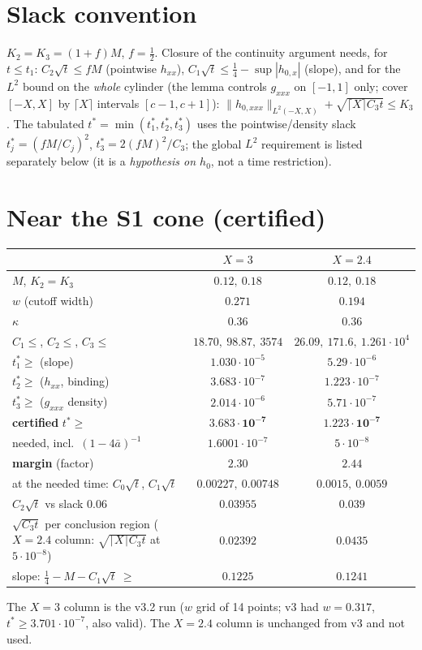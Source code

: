 \documentclass[11pt]{article}
\begin{document}
\section{Slack convention}
$K_2=K_3=(1+f)M$, $f=\frac12$. Closure of the continuity argument needs, for $t\le t_1$: $C_2\sqrt t\le fM$ (pointwise $h_{xx}$), $C_1\sqrt t\le \frac14-\sup|h_{0,x}|$ (slope), and for the $L^2$ bound on the \emph{whole} cylinder (the lemma controls $g_{xxx}$ on $[-1,1]$ only; cover $[-X,X]$ by $\lceil X\rceil$ intervals $[c-1,c+1]$): $\|h_{0,xxx}\|_{L^2(-X,X)}+\sqrt{\lceil X\rceil C_3t}\le K_3$. The tabulated $t^*=\min(t_1^*,t_2^*,t_3^*)$ uses the pointwise/density slack $t_j^*=(fM/C_j)^2$, $t_3^*=2(fM)^2/C_3$; the global $L^2$ requirement is listed separately below (it is a \emph{hypothesis on $h_0$}, not a time restriction).

\section{Near the S1 cone (certified)}
\begin{center}\small\begin{tabular}{lcc}\toprule
 & $X=3$ & $X=2.4$\\\midrule
$M$, $K_2=K_3$ & $0.12,\ 0.18$ & $0.12,\ 0.18$\\
$w$ (cutoff width) & $0.271$ & $0.194$\\
$\kappa$ & $0.36$ & $0.36$\\
$C_1\le$, $C_2\le$, $C_3\le$ & $18.70,\ 98.87,\ 3574$ & $26.09,\ 171.6,\ 1.261\cdot10^4$\\
$t_1^*\ge$ (slope) & $1.030\cdot10^{-5}$ & $5.29\cdot10^{-6}$\\
$t_2^*\ge$ ($h_{xx}$, binding) & $3.683\cdot10^{-7}$ & $1.223\cdot10^{-7}$\\
$t_3^*\ge$ ($g_{xxx}$ density) & $2.014\cdot10^{-6}$ & $5.71\cdot10^{-7}$\\
\textbf{certified} $t^*\ge$ & $\mathbf{3.683\cdot10^{-7}}$ & $\mathbf{1.223\cdot10^{-7}}$\\
needed, incl.\ $(1-4\bar a)^{-1}$ & $1.6001\cdot10^{-7}$ & $5\cdot10^{-8}$\\
\textbf{margin} (factor) & $\mathbf{2.30}$ & $\mathbf{2.44}$\\
at the needed time: $C_0\sqrt t$, $C_1\sqrt t$ & $0.00227,\ 0.00748$ & $0.0015,\ 0.0059$\\
 $C_2\sqrt t$ vs slack $0.06$ & $0.03955$ & $0.039$\\
 $\sqrt{C_3t}$ per conclusion region ($X=2.4$ column: $\sqrt{\lceil X\rceil C_3t}$ at $5\cdot10^{-8}$) & $0.02392$ & $0.0435$\\
slope: $\tfrac14-M-C_1\sqrt t\ \ge$ & $0.1225$ & $0.1241$\\\bottomrule
\end{tabular}\end{center}
The $X=3$ column is the v3.2 run ($w$ grid of 14 points; v3 had $w=0.317$, $t^*\ge3.701\cdot10^{-7}$, also valid). The $X=2.4$ column is unchanged from v3 and not used.
\end{document}
